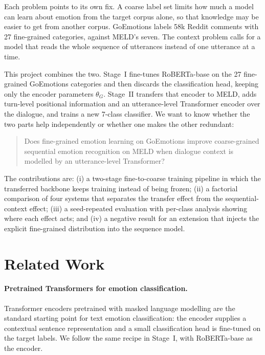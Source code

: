 \documentclass[sigconf,nonacm]{acmart}
\begin{document}
Each problem points to its own fix. A coarse label set limits how much a model can learn
about emotion from the target corpus alone, so that knowledge may be easier to get from
another corpus. GoEmotions labels 58k Reddit comments with 27 fine-grained categories,
against MELD's seven. The context problem calls for a model that reads the whole sequence
of utterances instead of one utterance at a time.

This project combines the two. Stage~I fine-tunes RoBERTa-base on the 27 fine-grained
GoEmotions categories and then discards the classification head, keeping only the encoder
parameters $\theta_G$. Stage~II transfers that encoder to MELD, adds turn-level positional
information and an utterance-level Transformer encoder over the dialogue, and trains a new
7-class classifier. We want to know whether the two parts help independently or whether
one makes the other redundant:

\begin{quote}
Does fine-grained emotion learning on GoEmotions improve coarse-grained sequential emotion
recognition on MELD when dialogue context is modelled by an utterance-level Transformer?
\end{quote}

The contributions are: (i) a two-stage fine-to-coarse training pipeline in which the
transferred backbone keeps training instead of being frozen; (ii) a factorial
comparison of four systems that separates the transfer effect from the sequential-context
effect; (iii) a seed-repeated evaluation with per-class analysis showing where each effect
acts; and (iv) a negative result for an extension that injects the explicit fine-grained
distribution into the sequence model.

\section{Related Work}
\paragraph{Pretrained Transformers for emotion classification.}
Transformer encoders pretrained with masked language modelling \citep{devlin2019bert,
liu2019roberta} are the standard starting point for text emotion classification: the
encoder supplies a contextual sentence representation and a small classification head is
fine-tuned on the target labels. We follow the same recipe in Stage~I, with RoBERTa-base
as the encoder.
\end{document}
